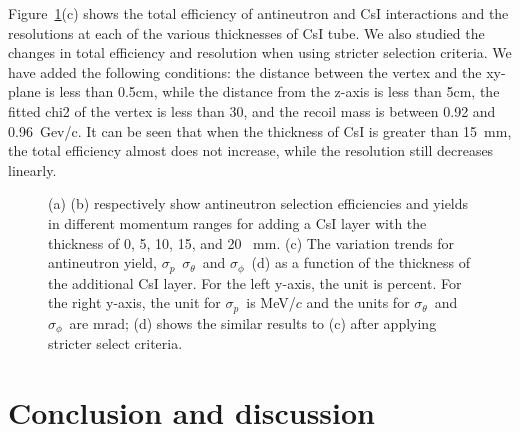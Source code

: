 \documentclass[aps,preprint,showkeys,superscriptaddress]{revtex4}
\newcommand{\pres}{$\sigma_p$}
\newcommand{\tres}{$\sigma_\theta$}
\newcommand{\phires}{$\sigma_\phi$}
\begin{document}
Figure~\ref{fig:ppinbar}(c) shows the total efficiency of antineutron and CsI interactions 
and the resolutions at each of the various thicknesses of CsI tube.
We also studied the changes in total efficiency and resolution when using stricter
selection criteria. We have added the following conditions: the distance
between the vertex and the xy-plane is less than 0.5cm, while the distance from
the z-axis is less than 5cm, the fitted chi2 of the vertex is less than 30, and
the recoil mass is between 0.92 and 0.96~Gev/c. It can be seen that when the
thickness of CsI is greater than 15~mm, the total efficiency almost does not
increase, while the resolution still decreases linearly.

\begin{figure}[htbp]
	\centering  %
	\subfigbottomskip=2pt %
	\subfigcapskip=-5pt %
	\caption{(a) (b) respectively show antineutron selection efficiencies and yields in different momentum ranges for adding a CsI layer with the thickness of 0, 5, 10, 15, and 20 ~mm. (c) The variation trends for antineutron yield, \pres\, \tres\ and \phires\ (d) as a function of the thickness of the additional CsI layer. For the left y-axis, the unit is percent. For the right y-axis, the unit for \pres\ is MeV/$c$ and the units for \tres\ and \phires\ are mrad; (d) shows the similar results to (c) after applying stricter select criteria. }
	\label{fig:ppinbar}
\end{figure}
        
        
\section{Conclusion and discussion}
\label{sec:conclusion}
\end{document}
